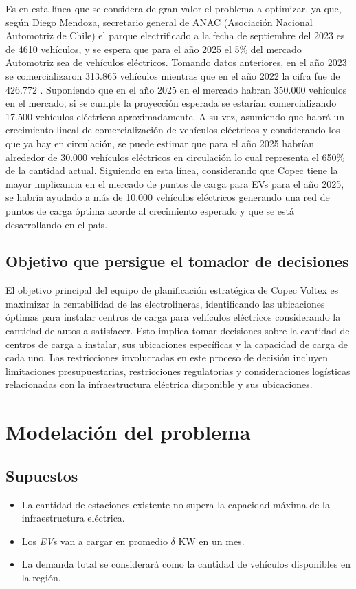 \documentclass[letterpaper]{article}
\begin{document}
\begin{flushleft}
	Es en esta línea que se considera de gran valor el problema a optimizar, ya que, según Diego Mendoza, secretario general de ANAC (Asociación Nacional Automotriz de Chile) el parque electrificado a la fecha de septiembre del 2023 es de 4610 vehículos, y se espera que para el año 2025 el 5\% del mercado Automotriz sea de vehículos eléctricos. Tomando datos anteriores, en el año 2023 se comercializaron 313.865 vehículos \cite{chileautos} mientras que en el año 2022 la cifra fue de 426.772 \cite{Tercera-1}. Suponiendo que en el año 2025 en el mercado habran 350.000 vehículos en el mercado, si se cumple la proyección esperada se estarían comercializando 17.500 vehículos eléctricos aproximadamente. A su vez, asumiendo que habr\'a un crecimiento lineal de comercializaci\'on de veh\'iculos el\'ectricos y considerando los que ya hay en circulaci\'on, se puede estimar que para el año 2025 habr\'ian alrededor de 30.000 vehículos eléctricos en circulación lo cual representa el 650\% de la cantidad actual. Siguiendo en esta línea, considerando que Copec tiene la mayor implicancia en el mercado de puntos de carga para EVs para el año 2025, se habr\'ia ayudado a más de 10.000 vehículos eléctricos generando una red de puntos de carga óptima acorde al crecimiento esperado y que se está desarrollando en el país.
	\subsection{Objetivo que persigue el tomador de decisiones}
	El objetivo principal del equipo de planificación estratégica de Copec Voltex es maximizar la rentabilidad de las electrolineras, identificando las ubicaciones óptimas para instalar centros de carga para vehículos eléctricos considerando la cantidad de autos a satisfacer. Esto implica tomar decisiones sobre la cantidad de centros de carga a instalar, sus ubicaciones específicas y la capacidad de carga de cada uno. Las restricciones involucradas en este proceso de decisión incluyen limitaciones presupuestarias, restricciones regulatorias y consideraciones logísticas relacionadas con la infraestructura eléctrica disponible y sus ubicaciones.

	\section{Modelación del problema}
	\subsection*{Supuestos}
	\begin{itemize}
		\item La cantidad de estaciones existente no supera la capacidad máxima de la infraestructura eléctrica.
		\item Los \textit{EV}s van a cargar en promedio $\delta$ KW en un mes.
		\item La demanda total se considerar\'a como la cantidad de veh\'iculos disponibles en la regi\'on.
	\end{itemize}

\end{flushleft}
\end{document}
